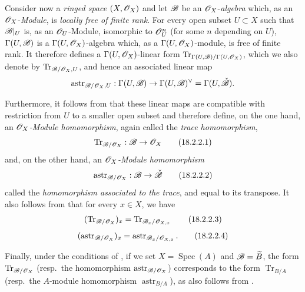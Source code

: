 \begin{env}[18.2.2]
\label{IV.18.2.2}
Consider now a \emph{ringed space} $(X,\mathscr{O}_X)$ and let $\mathscr{B}$ be an $\mathscr{O}_X$-\emph{algebra} which, as an $\mathscr{O}_X$-\emph{Module}, is \emph{locally free of finite rank}.  For every open subset $U\subset X$ such that $\mathscr{B}|_U$ is, as an $\mathscr{O}_U$-Module, isomorphic to $\mathscr{O}_U^n$ (for some $n$ depending on $U$), $\Gamma(U,\mathscr{B})$ is a $\Gamma(U,\mathscr{O}_X)$-algebra which, as a $\Gamma(U,\mathscr{O}_X)$-module, is free of finite rank.  It therefore defines a $\Gamma(U,\mathscr{O}_X)$-linear form $\operatorname{Tr}_{\Gamma(U,\mathscr{B})/\Gamma(U,\mathscr{O}_X)}$, which we also denote by $\operatorname{Tr}_{\mathscr{B}/\mathscr{O}_X,U}$, and hence an associated linear map
\[
\operatorname{astr}_{\mathscr{B}/\mathscr{O}_X,U}:\Gamma(U,\mathscr{B})\to\Gamma(U,\mathscr{B})^\vee=\Gamma(U,\check{\mathscr{B}}).
\]

Furthermore, it follows from  that these linear maps are compatible with restriction from $U$ to a smaller open subset and therefore define, on the one hand, an \emph{$\mathscr{O}_X$-Module homomorphism}, again called the \emph{trace homomorphism},
\[
\label{IV.18.2.2.1}
\operatorname{Tr}_{\mathscr{B}/\mathscr{O}_X}:\mathscr{B}\to\mathscr{O}_X
\tag{18.2.2.1}
\]
and, on the other hand, an \emph{$\mathscr{O}_X$-Module homomorphism}
\[
\label{IV.18.2.2.2}
\operatorname{astr}_{\mathscr{B}/\mathscr{O}_X}:\mathscr{B}\to\check{\mathscr{B}}
\tag{18.2.2.2}
\]
called the \emph{homomorphism associated to the trace}, and equal to its transpose.
It also follows from  that for every $x\in X$, we have
\[
\label{IV.18.2.2.3}
(\operatorname{Tr}_{\mathscr{B}/\mathscr{O}_X})_x=\operatorname{Tr}_{\mathscr{B}_x/\mathscr{O}_{X,x}}
\tag{18.2.2.3}
\]
\[
\label{IV.18.2.2.4}
(\operatorname{astr}_{\mathscr{B}/\mathscr{O}_X})_x=\operatorname{astr}_{\mathscr{B}_x/\mathscr{O}_{X,x}}.
\tag{18.2.2.4}
\]

Finally, under the conditions of , if we set $X=\operatorname{Spec}(A)$ and $\mathscr{B}=\widetilde{B}$, the form $\operatorname{Tr}_{\mathscr{B}/\mathscr{O}_X}$ (resp.\ the homomorphism $\operatorname{astr}_{\mathscr{B}/\mathscr{O}_X}$) corresponds to the form $\operatorname{Tr}_{B/A}$ (resp.\ the $A$-module homomorphism $\operatorname{astr}_{B/A}$), as also follows from .
\end{env}

